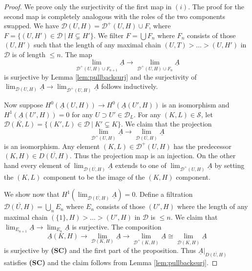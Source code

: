 \documentclass[12pt,a4paper]{article}
\theoremstyle{definition}
\begin{document}
\begin{proof}
We prove only the surjectivity of the first map in $(i)$. The proof for the second map is completely analogous with the roles of the two components swapped.
We have $\mathcal{D}(U,H)=\mathcal{D}^+(U,H)\cup F$, where $F=\{(U,H')\in \mathcal{D}~|~ H\subsetneq H'\}$. We filter $F=\bigcup F_n$ where $F_n$ consists of those $(U,H')$ such that the length of any maximal chain $(U,T)>\ldots>(U,H')$ in $\mathcal{D}$ is of length $\leq n$. The map \[\lim_{\mathcal{D}^+(U,H)\cup F_{n+1}}\underline{A}\longrightarrow \lim_{\mathcal{D}^+(U,H)\cup F_n}\underline{A}
\]
is surjective by Lemma \ref{lem:pullbacksurj} and the surjectivity of $\lim_{\mathcal{D}(U,H)}\underline A\longrightarrow \lim_{\mathcal{D}^+(U,H)}\underline{A}$ follows inductively.

Now suppose $H^0(\underline{A}(U,H))\rightarrow H^0(\underline{A}(U',H))$ is an isomorphism and $H^1(\underline{A}(U',H))=0$ for any $U\supset U'\in \mathcal{D}_L$. For any $(K,L)\in \mathcal{S}$, let $\overline{\mathcal{D}(K,L)}=\{(K',L)\in\mathcal{D}~|~K'\subsetneq K\}$. We claim that the projection
\[\lim_{\mathcal{D}^+(U,H)}\underline{A}\longrightarrow \lim_{\overline{\mathcal{D}(U,H)}}\underline{A}\]
is an isomorphism. Any element $(K,L)\in\mathcal{D}^+(U,H)$ has the predecessor $(K,H)\in \overline{D(U,H)}$. Thus the projection map is an injection. On the other hand every element of $\lim_{\overline{\mathcal{D}(U,H)}}\underline{A}$ extends to one of $\lim_{{\mathcal{D}^+(U,H)}}\underline{A}$ by setting the $(K,L)$ component to be the image of the $(K,H)$ component.

We show now that $H^1(\lim_{\overline{\mathcal{D}(U,H)}}\underline{A})=0$. Define a filtration $\overline{\mathcal{D}(U,H)}=\bigcup_n E_n$ where $E_n$ consists of those $(U',H)$ where the length of any maximal chain $(\{1\},H)>\ldots>(U',H)$ in $\mathcal{D}$ is $\leq n$. We claim that $\lim_{E_{n+1}}\underline{A}\rightarrow \lim_{E_n}\underline{A}$ is surjective. The composition
\[\underline{A}(K,H)\rightarrow\lim_{\mathcal{D}(K,H)}\underline{A}\rightarrow \lim_{\mathcal{D}^+(K,H)}\underline{A}\cong \lim_{\overline{\mathcal{D}(K,H)}}\underline{A}\]
is surjective by \textbf{(SC)} and the first part of the proposition. Thus $\underline{A}|_{\overline{D(U,H)}}$ satisfies \textbf{(SC)} and the claim follows from Lemma \ref{lem:pullbacksurj}.


\end{proof}
\end{document}
